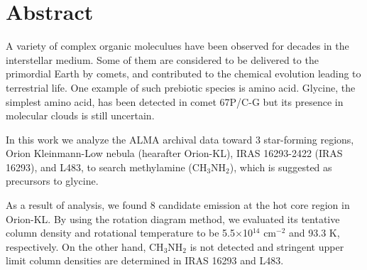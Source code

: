 \chapter*{Abstract}

\singlespacing
\doublespacing

A variety of complex organic moleculues have been observed for decades in the interstellar medium.
Some of them are considered to be delivered to the primordial Earth by comets, 
and contributed to the chemical evolution leading to terrestrial life.
One example of such prebiotic species is amino acid. Glycine, the simplest amino acid, 
has been detected in comet 67P/C-G but its presence in molecular clouds is still uncertain.

In this work we analyze the ALMA archival data toward 3 star-forming regions, 
Orion Kleinmann-Low nebula (hearafter Orion-KL), IRAS 16293-2422 (IRAS 16293), and L483,
to search methylamine (CH$_3$NH$_2$), which is suggested as precursors to glycine. 

As a result of analysis, we found 8 candidate emission at the hot core region in Orion-KL.
By using the rotation diagram method, we evaluated its tentative column density 
and rotational temperature to be 5.5$\times$10$^{14}$ cm$^{-2}$ and 93.3 K, respectively. 
On the other hand, CH$_3$NH$_2$ is not detected and stringent upper limit column densities
are determined in IRAS 16293 and L483.